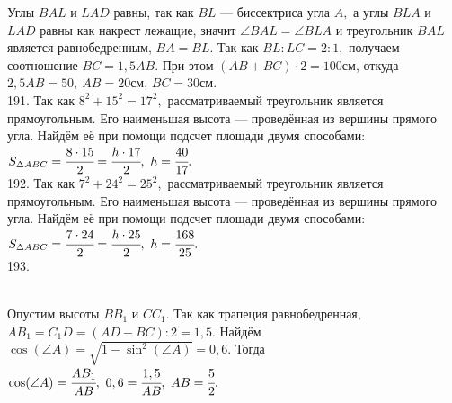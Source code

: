 \documentclass[12pt]{article}
\begin{document}
Углы $BAL$ и $LAD$ равны, так как $BL$ --- биссектриса угла $A,$ а углы $BLA$ и $LAD$ равны как накрест лежащие, значит $\angle BAL=\angle BLA$ и треугольник $BAL$ является равнобедренным, $BA=BL.$ Так как $BL:LC=2:1,$ получаем соотношение $BC=1,5AB.$ При этом $(AB+BC)\cdot2=100$см, откуда $2,5AB=50,\ AB=20$см, $BC=30$см.\\
191. Так как $8^2+15^2=17^2,$ рассматриваемый треугольник является прямоугольным. Его наименьшая высота --- проведённая из вершины прямого угла. Найдём её при помощи подсчет площади двумя способами: $S_{\Delta ABC}=\cfrac{8\cdot15}{2}=\cfrac{h\cdot17}{2},\ h=\cfrac{40}{17}.$\\
192. Так как $7^2+24^2=25^2,$ рассматриваемый треугольник является прямоугольным. Его наименьшая высота --- проведённая из вершины прямого угла. Найдём её при помощи подсчет площади двумя способами: $S_{\Delta ABC}=\cfrac{7\cdot24}{2}=\cfrac{h\cdot25}{2},\ h=\cfrac{168}{25}.$\\
193. \begin{figure}[ht!]
\end{figure}\\
Опустим высоты $BB_1$ и $CC_1.$ Так как трапеция равнобедренная, $AB_1=C_1D=(AD-BC):2=1,5.$ Найдём $\cos(\angle A)=\sqrt{1-\sin^2(\angle A)}=0,6.$ Тогда
$\cos(\angle A)=\cfrac{AB_1}{AB},\ 0,6=\cfrac{1,5}{AB},\ AB=\cfrac{5}{2}.$\\
\end{document}
